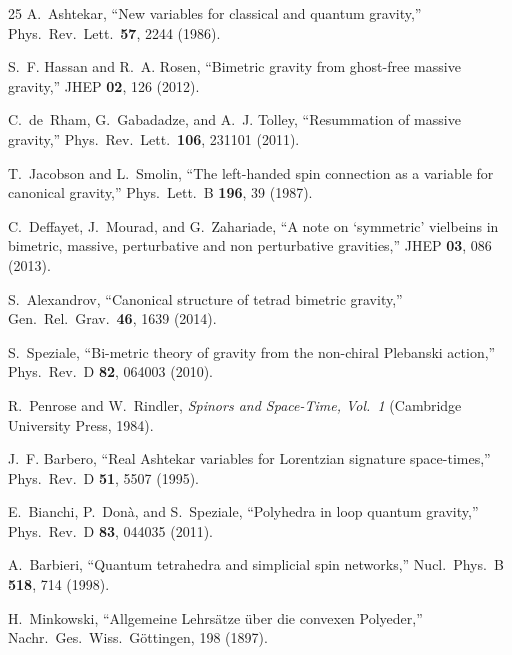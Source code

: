 \documentclass[aps,prd,preprint,superscriptaddress,showpacs,preprintnumbers,amsmath,amssymb,nofootinbib]{revtex4-2}
\begin{document}
\begin{thebibliography}{25}
A.~Ashtekar, ``New variables for classical and quantum gravity,'' Phys.\ Rev.\ Lett.\ \textbf{57}, 2244 (1986).

S.~F. Hassan and R.~A. Rosen, ``Bimetric gravity from ghost-free massive gravity,'' JHEP \textbf{02}, 126 (2012).

C.~de~Rham, G.~Gabadadze, and A.~J. Tolley, ``Resummation of massive gravity,'' Phys.\ Rev.\ Lett.\ \textbf{106}, 231101 (2011).

T.~Jacobson and L.~Smolin, ``The left-handed spin connection as a variable for canonical gravity,'' Phys.\ Lett.\ B \textbf{196}, 39 (1987).

C.~Deffayet, J.~Mourad, and G.~Zahariade, ``A note on `symmetric' vielbeins in bimetric, massive, perturbative and non perturbative gravities,'' JHEP \textbf{03}, 086 (2013).

S.~Alexandrov, ``Canonical structure of tetrad bimetric gravity,'' Gen.\ Rel.\ Grav.\ \textbf{46}, 1639 (2014).

S.~Speziale, ``Bi-metric theory of gravity from the non-chiral Plebanski action,'' Phys.\ Rev.\ D \textbf{82}, 064003 (2010).

R.~Penrose and W.~Rindler, \emph{Spinors and Space-Time, Vol.\ 1} (Cambridge University Press, 1984).

J.~F. Barbero, ``Real Ashtekar variables for Lorentzian signature space-times,'' Phys.\ Rev.\ D \textbf{51}, 5507 (1995).

E.~Bianchi, P.~Don\`a, and S.~Speziale, ``Polyhedra in loop quantum gravity,'' Phys.\ Rev.\ D \textbf{83}, 044035 (2011).

A.~Barbieri, ``Quantum tetrahedra and simplicial spin networks,'' Nucl.\ Phys.\ B \textbf{518}, 714 (1998).

H.~Minkowski, ``Allgemeine Lehrs\"atze \"uber die convexen Polyeder,'' Nachr.\ Ges.\ Wiss.\ G\"ottingen, 198 (1897).

\end{thebibliography}
\end{document}
